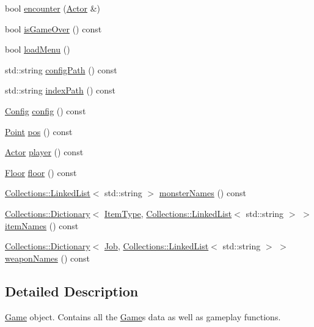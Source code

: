 \begin{DoxyCompactItemize}
bool \hyperlink{class_flow_1_1_game_a6dae12a63733a289b34a03dd8d709139}{encounter} (\hyperlink{class_flow_1_1_actor}{Actor} \&)
\item 
bool \hyperlink{class_flow_1_1_game_a66ce2ce0a7e590682aa064b240cc4024}{is\+Game\+Over} () const
\item 
bool \hyperlink{class_flow_1_1_game_a685c4a00d30acbd2e17ce4244a18f595}{load\+Menu} ()
\item 
std\+::string \hyperlink{class_flow_1_1_game_a447cb57574a380a17d26087d10151c5c}{config\+Path} () const
\item 
std\+::string \hyperlink{class_flow_1_1_game_a200c86e4c7a3f63b8dd27819eed1b13c}{index\+Path} () const
\item 
\hyperlink{struct_flow_1_1_config}{Config} \hyperlink{class_flow_1_1_game_a032b087aa124b6882a260c264d3d3922}{config} () const
\item 
\hyperlink{struct_flow_1_1_point}{Point} \hyperlink{class_flow_1_1_game_a422898b838eb808cf5f5e832a225adb7}{pos} () const
\item 
\hyperlink{class_flow_1_1_actor}{Actor} \hyperlink{class_flow_1_1_game_a8c0df90f917b0111944464cdea5c24fd}{player} () const
\item 
\hyperlink{class_flow_1_1_floor}{Floor} \hyperlink{class_flow_1_1_game_a9b18f73128d214e1774b75ce05d63039}{floor} () const
\item 
\hyperlink{class_collections_1_1_linked_list}{Collections\+::\+Linked\+List}$<$ std\+::string $>$ \hyperlink{class_flow_1_1_game_a4adcdf9a6c23065c19af4fae3a0a731f}{monster\+Names} () const
\item 
\hyperlink{class_collections_1_1_dictionary}{Collections\+::\+Dictionary}$<$ \hyperlink{namespace_flow_a09368c0b65b3d1bc5c227ed1046c8bca}{Item\+Type}, \hyperlink{class_collections_1_1_linked_list}{Collections\+::\+Linked\+List}$<$ std\+::string $>$ $>$ \hyperlink{class_flow_1_1_game_a21ce5c0b4e1b53fa661e85af8b0342de}{item\+Names} () const
\item 
\hyperlink{class_collections_1_1_dictionary}{Collections\+::\+Dictionary}$<$ \hyperlink{namespace_flow_a05bb774db920847e46f3779aaef1b07b}{Job}, \hyperlink{class_collections_1_1_linked_list}{Collections\+::\+Linked\+List}$<$ std\+::string $>$ $>$ \hyperlink{class_flow_1_1_game_abbcc4db0f8c813849e1d110871a5bf66}{weapon\+Names} () const
\end{DoxyCompactItemize}


\subsection{Detailed Description}
\hyperlink{class_flow_1_1_game}{Game} object. Contains all the \hyperlink{class_flow_1_1_game}{Game}\textquotesingle{}s data as well as gameplay functions. 

